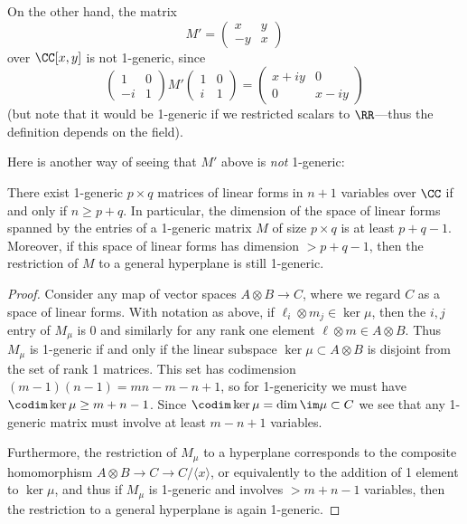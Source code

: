On the other hand, the matrix
$$
M' = \begin{pmatrix}
 x &y\\
 -y&x
\end{pmatrix}
$$
over $\CC[x,y]$ is not 1-generic, since
$$
\begin{pmatrix}
1&0\\
-i&1 
\end{pmatrix}
M'
\begin{pmatrix}
 1&0\\
 i&1
\end{pmatrix}
= 
\begin{pmatrix}
 x+iy&0\\
 0&x-iy
\end{pmatrix}
$$
(but note that it would be 1-generic if we restricted scalars to $\RR$---thus the definition depends on the field).

Here is another way of seeing that $M'$ above is \emph{not} 1-generic:

\begin{lemma}\label{variables needed}
  \label{size of 1-generic} There exist 1-generic $p\times q$ matrices of linear forms in $n+1$ variables over $\CC$ if and only if $n\geq p+q$.
In particular, the dimension of the space of linear forms spanned by the entries of a  1-generic matrix $M$ of size $p\times q$ is at least $p+q-1$. Moreover, if this space of linear forms has dimension $>p+q-1$, then the restriction of $M$ to a general hyperplane is still 1-generic.
\end{lemma}
\begin{proof} Consider any map of vector spaces $A\otimes B \to C$, where we regard $C$ as a 
space of linear forms.
With notation as above, if $\ell_i\otimes m_j\in \ker \mu$, then the $i,j$ entry of $M_\mu$ is 0 and similarly for
any rank one element $\ell\otimes m\in A\otimes B$. Thus $M_\mu$ is 1-generic if and only if the linear subspace
$\ker \mu \subset  A\otimes B$
is disjoint from the set of rank 1 matrices. This set has codimension $(m-1)(n-1) = mn-m-n+1$,
so for 1-genericity we must have $\codim \ker \mu \geq m+n-1$. Since $\codim \ker \mu = \dim \im \mu\subset C$ we see that any 1-generic matrix must involve at least $m-n+1$ variables. 

Furthermore, the restriction of $M_\mu$ to a hyperplane corresponds to the composite homomorphism
$A\otimes B \to C \to C/\langle x \rangle$, or equivalently to the addition of 1 element to $\ker \mu$, and thus
if $M_\mu$ is 1-generic and involves $>m+n-1$ variables, then the restriction to a general hyperplane
is again 1-generic.
\end{proof}

